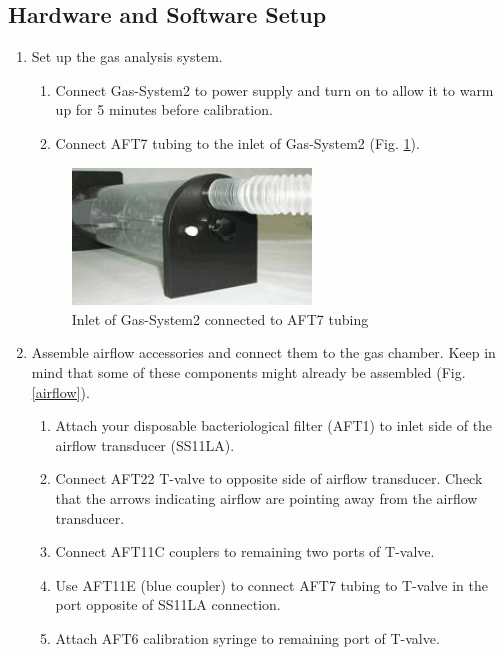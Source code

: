 \documentclass{article}
\begin{document}
\subsection*{Hardware and Software Setup}
\begin{enumerate}
	\item Set up the gas analysis system.\begin{enumerate}
	\item Connect Gas-System2 to power supply and turn on to allow it to warm up for 5 minutes before calibration.
	\item Connect AFT7 tubing to the inlet of Gas-System2 (Fig. \ref{inlet}).
	\end{enumerate}
	
	\begin{figure}[h]
	\centering\includegraphics[width=0.6\textwidth]{../images/PF_II_2.jpg}
	\caption{Inlet of Gas-System2 connected to AFT7 tubing}
	\label{inlet}
	\end{figure}
	
	\item Assemble airflow accessories and connect them to the gas chamber. Keep in mind that some of these components might already be assembled (Fig. \ref{airflow}).\begin{enumerate}
	\item Attach your disposable bacteriological filter (AFT1) to inlet side of the airflow transducer (SS11LA).
	\item Connect AFT22 T-valve to opposite side of airflow transducer. Check that the arrows indicating airflow are pointing away from the airflow transducer.
	\item Connect AFT11C couplers to remaining two ports of T-valve.
	\item Use AFT11E (blue coupler) to connect AFT7 tubing to T-valve in the port opposite of SS11LA connection.
	\item Attach AFT6 calibration syringe to remaining port of T-valve.
	\end{enumerate}
	

\end{enumerate}
\end{document}
